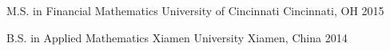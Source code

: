 


\begin{cvhonors}




	\cvhonor
	{M.S. in Financial Mathematics} %
	{University of Cincinnati} %
	{Cincinnati, OH} %
	{2015} %

	\cvhonor
	{B.S. in Applied Mathematics} %
	{Xiamen University} %
	{Xiamen, China} %
	{2014}

\end{cvhonors}